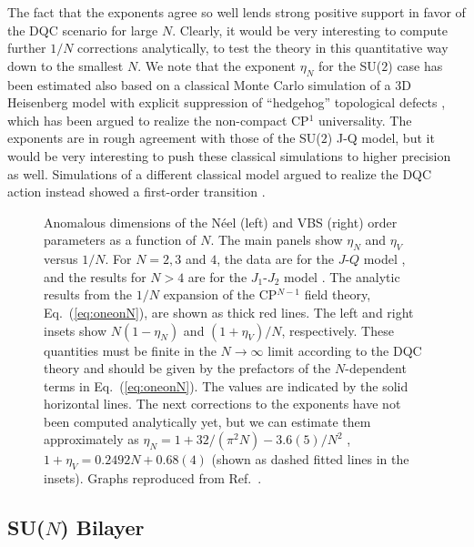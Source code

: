 \documentclass[range]{ar2e}
\begin{document}
The fact that the exponents agree so well lends strong positive support in favor of the DQC scenario for large $N$. Clearly, it would be 
very interesting to compute further $1/N$ corrections analytically, to test the theory in this quantitative way down to the smallest $N$. We note 
that the exponent $\eta_N$ for the SU($2$) case has been estimated also based on a classical Monte Carlo simulation of a 3D Heisenberg model with 
explicit suppression of ``hedgehog'' topological defects \cite{Motrunich04}, which has been argued to realize the non-compact CP$^1$ universality. 
The exponents are in rough agreement with those of the SU($2$) J-Q model, but it would be very interesting to push these classical simulations to 
higher precision as well. Simulations of a different classical model argued to realize the DQC action instead showed a first-order 
transition \cite{Kuklov08}.

\begin{figure}
\centerline{}
 \caption{ \label{fig:exp} Anomalous dimensions of the N\'eel (left) and VBS (right)
  order parameters as a function of $N$. The main panels show $\eta_N$ and $\eta_V$ versus $1/N$. For $N=2,3$ and $4$, the data are 
  for the $J$-$Q$ model \cite{lou2009:sun}, and the results for $N>4$ are for the $J_1$-$J_2$ model \cite{kaul2011:j1j2}. The analytic 
  results from the $1/N$ expansion of the CP$^{N-1}$ field theory, Eq.~(\ref{eq:oneonN}), are shown as thick red lines. The left and 
  right insets show $N(1-\eta_N)$ and $(1+\eta_V)/N$, respectively. These quantities must be finite in the  $N\rightarrow \infty$ 
  limit according to the DQC theory and should be given by the prefactors of the $N$-dependent terms in Eq.~(\ref{eq:oneonN}). The values
  are indicated by the solid horizontal lines. The next corrections to the exponents have not been computed analytically yet, but we can estimate 
  them approximately as $\eta_N = 1+32/(\pi^2 N)-3.6(5)/N^2$ , $1+\eta_V = 0.2492 N + 0.68(4)$ (shown as dashed fitted lines in the insets). 
  Graphs reproduced from Ref.~\cite{kaul2011:j1j2}.}
\end{figure}

\subsection{SU($N$) Bilayer}
\label{ss:bilN}
\end{document}
